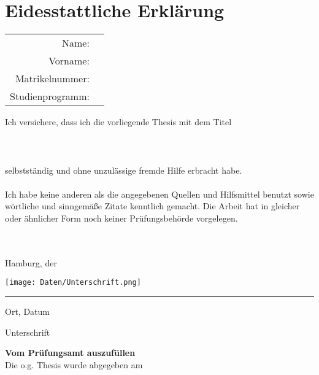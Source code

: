 \section*{Eidesstattliche Erklärung}

\begin{table}[H]
	\begin{tabular}{rl}
		Name:            & \Nachname \:         & \Vorname \nummer:  & \Matrikel \\
		Studienprogramm: & \Studiengang
	\end{tabular}
\end{table}

Ich versichere, dass ich die vorliegende Thesis mit dem Titel\\
\\
{\Large \Titel} \\
\\
selbstständig und ohne unzulässige fremde Hilfe erbracht habe.\\
\\
Ich habe keine anderen als die angegebenen Quellen und Hilfsmittel benutzt sowie wörtliche und sinngemäße Zitate kenntlich gemacht. Die Arbeit hat in gleicher oder ähnlicher Form noch keiner Prüfungsbehörde vorgelegen.\\
\\
\\
\begin{minipage}[H]{0.49\textwidth}
	Hamburg, der \Abgabe
\end{minipage}
\begin{minipage}[H]{0.49\textwidth}
	\texttt{[image: Daten/Unterschrift.png]}
\end{minipage}

\hrule
\vspace{3mm}

\begin{minipage}[H]{0.49\textwidth}
	Ort, Datum
\end{minipage}
\begin{minipage}[H]{0.49\textwidth}
	Unterschrift
\end{minipage}

\vspace{\fill}

\begin{minipage}[H]{0.49\textwidth}
	\textbf{Vom Prüfungsamt auszufüllen}\\
	{\small Die o.g. Thesis wurde abgegeben am}
	\vspace{3cm}
\end{minipage}
\begin{minipage}[H]{0.49\textwidth}
	\addtolength{\fboxrule}{0.03cm}
\end{minipage}

\vspace{1cm}